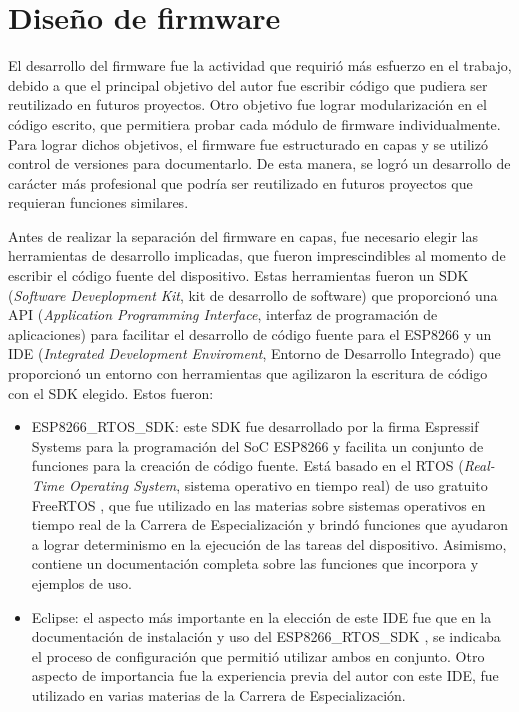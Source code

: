 

\section{Diseño de firmware}

El desarrollo del firmware fue la actividad que requirió más esfuerzo en el trabajo, debido a que el principal objetivo del autor fue escribir código que pudiera ser reutilizado en futuros proyectos. Otro objetivo fue lograr modularización en el código escrito, que permitiera probar cada módulo de firmware individualmente. Para lograr dichos objetivos, el firmware fue estructurado en capas y se utilizó control de versiones para documentarlo. De esta manera, se logró un desarrollo de carácter más profesional que podría ser reutilizado en futuros proyectos que requieran funciones similares.

Antes de realizar la separación del firmware en capas, fue necesario elegir las herramientas de desarrollo implicadas, que fueron imprescindibles al momento de escribir el código fuente del dispositivo. Estas herramientas fueron un SDK (\textit{Software Deveplopment Kit}, kit de desarrollo de software) que proporcionó una API (\textit{Application Programming Interface}, interfaz de programación de aplicaciones) para facilitar el desarrollo de código fuente para el ESP8266 y un IDE (\textit{Integrated Development Enviroment}, Entorno de Desarrollo Integrado) que proporcionó un entorno con herramientas que agilizaron la escritura de código con el SDK elegido. Estos fueron:

\begin{itemize}
	\item ESP8266\_RTOS\_SDK: este SDK fue desarrollado por la firma Espressif Systems para la programación del SoC ESP8266 y facilita un conjunto de funciones para la creación de código fuente. Está basado en el RTOS (\textit{Real-Time Operating System}, sistema operativo en tiempo real) de uso gratuito FreeRTOS \citep{WEBSITE:18}, que fue utilizado en las materias sobre sistemas operativos en tiempo real de la Carrera de Especialización y brindó funciones que ayudaron a lograr determinismo en la ejecución de las tareas del dispositivo. Asimismo, contiene un documentación completa sobre las funciones que incorpora y ejemplos de uso.
	\item Eclipse: el aspecto más importante en la elección de este IDE fue que en la documentación de instalación y uso del ESP8266\_RTOS\_SDK \citep{WEBSITE:23}, se indicaba el proceso de configuración que permitió utilizar ambos en conjunto. Otro aspecto de importancia fue la experiencia previa del autor con este IDE, fue utilizado en varias materias de la Carrera de Especialización.
\end{itemize}

